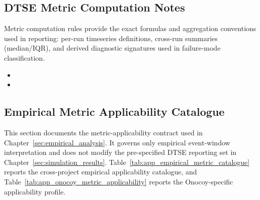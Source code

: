 \subsection{DTSE Metric Computation Notes}
\label{app:dtse_metric_computation}
Metric computation rules provide the exact formulas and aggregation conventions used in reporting: per-run timeseries definitions, cross-run summaries (median/IQR), and derived diagnostic signatures used in failure-mode classification.
\begin{itemize}
    \item {}
    \item {}
\end{itemize}

\subsection{Empirical Metric Applicability Catalogue}
\label{app:empirical_metric_applicability}
This section documents the metric-applicability contract used in Chapter~\ref{sec:empirical_analysis}. It governs only empirical event-window interpretation and does not modify the pre-specified DTSE reporting set in Chapter~\ref{sec:simulation_results}.
Table~\ref{tab:app_empirical_metric_catalogue} reports the cross-project empirical applicability catalogue, and Table~\ref{tab:app_onocoy_metric_applicability} reports the Onocoy-specific applicability profile.

